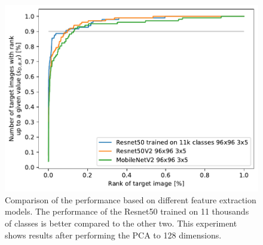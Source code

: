 \begin{figure}
    \centering
    \includegraphics[width=0.8\linewidth]{graphs/2536f6c96149dea24dae84dbf52f760d7d58b0dffa7d660656e1784d9dca277f.pdf}
    \caption{Comparison of the performance based on different feature extraction models. The performance of the Resnet50 trained on 11 thousands of classes is better compared to the other two. This experiment shows results after performing the PCA to 128 dimensions.}
    \label{fig:networks}
\end{figure}





